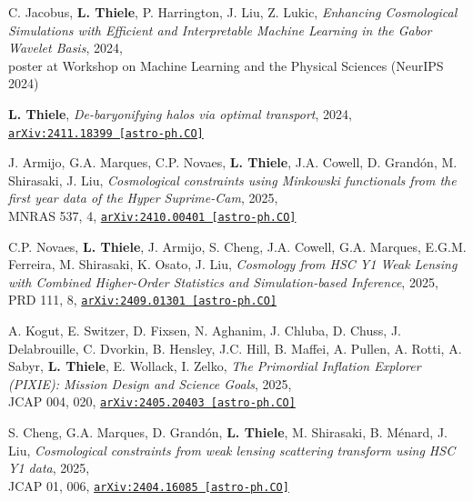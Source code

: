 \begin{minipage}{\textwidth}
C. Jacobus, {\bf L. Thiele}, P. Harrington, J. Liu, Z. Lukic,
\emph{Enhancing Cosmological Simulations with Efficient and Interpretable Machine Learning
in the Gabor Wavelet Basis}, 2024,\\
poster at Workshop on Machine Learning and the Physical Sciences (NeurIPS 2024)
\end{minipage}

\begin{minipage}{\textwidth}
{\bf L. Thiele}, \emph{De-baryonifying halos via optimal transport}, 2024,\\
\href{http://arxiv.org/abs/2411.18399}{\mbox{\texttt{arXiv:2411.18399 [astro-ph.CO]}}}
\end{minipage}

\begin{minipage}{\textwidth}
J. Armijo, G.A. Marques, C.P. Novaes, {\bf L. Thiele}, J.A. Cowell, D. Grand\'on, M. Shirasaki, J. Liu,
\emph{Cosmological constraints using Minkowski functionals from the first year
data of the Hyper Suprime-Cam}, 2025,\\
MNRAS 537, 4,
\href{https://arxiv.org/abs/2410.00401}{\mbox{\texttt{arXiv:2410.00401 [astro-ph.CO]}}}
\end{minipage}

\begin{minipage}{\textwidth}
C.P. Novaes, {\bf L. Thiele}, J. Armijo, S. Cheng, J.A. Cowell, G.A. Marques, E.G.M. Ferreira, M. Shirasaki, K. Osato, J. Liu,
\emph{Cosmology from HSC Y1 Weak Lensing with Combined Higher-Order Statistics and
Simulation-based Inference}, 2025,\\
PRD 111, 8,
\href{https://arxiv.org/abs/2409.01301}{\mbox{\texttt{arXiv:2409.01301 [astro-ph.CO]}}}
\end{minipage}

\begin{minipage}{\textwidth}
A. Kogut, E. Switzer, D. Fixsen, N. Aghanim, J. Chluba, D. Chuss, J. Delabrouille, C. Dvorkin, B. Hensley, J.C. Hill, B. Maffei, A. Pullen, A. Rotti, A. Sabyr, {\bf L. Thiele}, E. Wollack, I. Zelko,
\emph{The Primordial Inflation Explorer (PIXIE): Mission Design and Science Goals}, 2025,\\
JCAP 004, 020,
\href{https://arxiv.org/abs/2405.20403}{\mbox{\texttt{arXiv:2405.20403 [astro-ph.CO]}}}
\end{minipage}

\begin{minipage}{\textwidth}
S. Cheng, G.A. Marques, D. Grand\'on, {\bf L. Thiele}, M. Shirasaki, B. M\'enard, J. Liu,
\emph{Cosmological constraints from weak lensing scattering transform using HSC Y1 data}, 2025,\\
JCAP 01, 006,
\href{https://arxiv.org/abs/2404.16085}{\mbox{\texttt{arXiv:2404.16085 [astro-ph.CO]}}}
\end{minipage}

